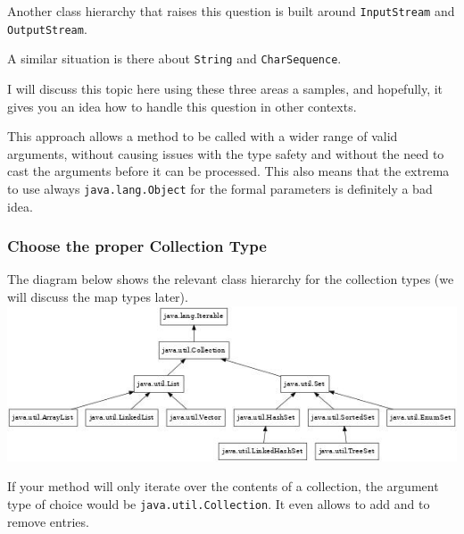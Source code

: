 \documentclass[11pt,a4paper, titlepage, parskip=half, headsepline, footsepline, cleardoublepage=current, headheight=1cm]{scrbook}
\begin{document}
Another class hierarchy that raises this question is built around \lstinline|InputStream|\autocite{ORACLE_DOC_INPUTSTREAM_CLASS} and \lstinline|OutputStream|\autocite{ORACLE_DOC_OUTPUTSTREAM_CLASS}.

A similar situation is there about \lstinline|String|\autocite{ORACLE_DOC_STRING_CLASS} and \lstinline|CharSequence|\autocite{ORACLE_DOC_CHARSEQUENCE_INTERFACE}.

I will discuss this topic here using these three areas a samples, and hopefully, it gives you an idea how to handle this question in other contexts.

This approach allows a method to be called with a wider range of valid arguments, without causing issues with the type safety and without the need to cast the arguments before it can be processed. This also means that the extrema to use always \lstinline|java.lang.Object|\autocite{ORACLE_DOC_OBJECT_CLASS} for the formal parameters is definitely a bad idea.


\subsubsection{Choose the proper Collection Type}\label{sec:ChooseTheProperCollectionType}
The diagram below shows the relevant class hierarchy for the collection types (we will discuss the map types later).
\newline
\includegraphics{collection}
\newline

If your method will only iterate over the contents of a collection, the argument type of choice would be \lstinline|java.util.Collection|\autocite{ORACLE_DOC_COLLECTION_INTERFACE}. It even allows to add and to remove entries.
\end{document}
